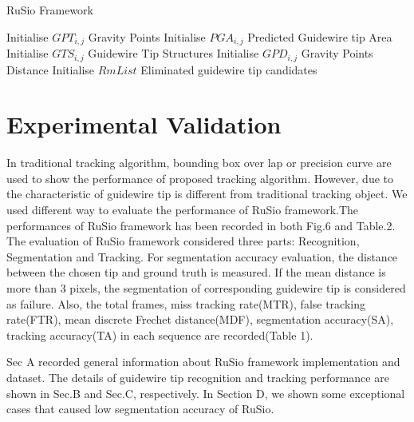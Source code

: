 \documentclass[journal]{IEEEtran}
\begin{document}
\begin{algorithm}[!htbp]
\setlength{\abovedisplayskip}{3pt}
\setlength{\belowdisplayskip}{-3pt}
	\caption{RuSio Framework}
		Initialise $GPT_{i,j}$ Gravity Points\; 
		Initialise $PGA_{i,j}$ Predicted Guidewire tip Area\; 
		Initialise $GTS_{i,j}$ Guidewire Tip Structures\; 
		Initialise $GPD_{i,j}$ Gravity Points Distance\; 
		Initialise $RmList$ Eliminated guidewire tip candidates\; 
\end{algorithm}


\section{Experimental Validation}
In traditional tracking algorithm, bounding box over lap \cite{Henriques2014High} or precision curve \cite{Babenko2011Robust} are used to show the performance of proposed tracking algorithm. However, due to the characteristic of guidewire tip is different from traditional tracking object. We used different way to evaluate the performance of RuSio framework.The performances of RuSio framework has been recorded in both Fig.6 and Table.2. The evaluation of RuSio framework considered three parts: Recognition, Segmentation and Tracking. For segmentation accuracy evaluation, the distance between the chosen tip and ground truth is measured. If the mean distance is more than 3 pixels, the segmentation of corresponding guidewire tip is considered as failure. Also, the total frames, miss tracking rate(MTR), false tracking rate(FTR), mean discrete Frechet distance(MDF), segmentation accuracy(SA), tracking accuracy(TA) in each sequence are recorded(Table 1).
\par
Sec A recorded general information about RuSio framework implementation and dataset. The details of guidewire tip recognition and tracking performance are shown in Sec.B and Sec.C, respectively. In Section D, we shown some exceptional cases that caused low segmentation accuracy of RuSio. 
\end{document}
